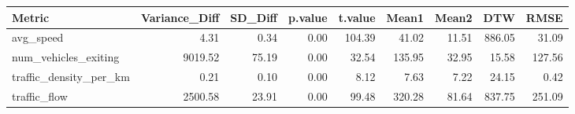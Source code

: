 \begin{table}[ht]
\centering
\begin{tabular}{lrrrrrrrr}
  \hline
Metric & Variance\_Diff & SD\_Diff & p.value & t.value & Mean1 & Mean2 & DTW & RMSE \\ 
  \hline
avg\_speed & 4.31 & 0.34 & 0.00 & 104.39 & 41.02 & 11.51 & 886.05 & 31.09 \\ 
  num\_vehicles\_exiting & 9019.52 & 75.19 & 0.00 & 32.54 & 135.95 & 32.95 & 15.58 & 127.56 \\ 
  traffic\_density\_per\_km & 0.21 & 0.10 & 0.00 & 8.12 & 7.63 & 7.22 & 24.15 & 0.42 \\ 
  traffic\_flow & 2500.58 & 23.91 & 0.00 & 99.48 & 320.28 & 81.64 & 837.75 & 251.09 \\ 
   \hline
\end{tabular}
\end{table}
